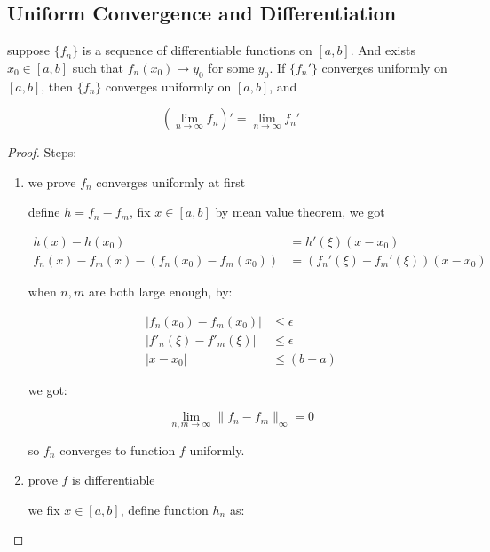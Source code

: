 \subsection{Uniform Convergence and Differentiation}

\begin{thm}
    suppose $\{ f_n \}$ is a sequence of differentiable functions on $[a,b]$.
    And exists $x_0 \in [a,b]$ such that $f_n(x_0) \to y_0$ for some $y_0$. If $\{ f_n' \}$
    converges uniformly on $[a,b]$, then $\{ f_n\}$ converges uniformly on $[a,b]$, and

    \[
        \left( \lim_{n \to \infty}f_n \right)' = \lim_{n \to \infty} f_n'
    \]
\end{thm}

\begin{proof}
    Steps:
    
    \begin{enumerate}
        \item we prove $f_n$ converges uniformly at first

        define $h = f_n - f_m$, fix $x \in [a,b]$ by mean value theorem, we got

        \begin{align*}
            h(x) - h(x_0) &= h'(\xi)(x - x_0) \\
            f_n(x) -  f_m(x) - \left(f_n(x_0) - f_m(x_0) \right) &= \left(f_n'(\xi) -f_m'(\xi) \right)(x-x_0)
        \end{align*}

        when $n,m$ are both large enough, by:
        
        \begin{align*}
            \left| f_n(x_0) - f_m(x_0) \right| & \le \epsilon \\
            \left| f'_n(\xi) - f'_m(\xi) \right| & \le \epsilon \\
            \left| x -x_0 \right| & \le (b-a) 
        \end{align*}

        we got:

        \[
            \lim_{n,m \to \infty} \| f_n - f_m\|_\infty = 0
        \]

        so $f_n$ converges to function $f$ uniformly.

        \item prove $f$ is differentiable
        
        we fix $x \in [a,b]$, define function $h_n$ as:


\end{enumerate}
\end{proof}
